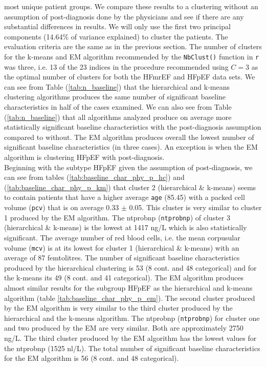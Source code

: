 \documentclass[../thesis.tex]{subfiles}
\begin{document}
\noindent most unique patient groups. We compare these results to a clustering without an assumption of post-diagnosis done by the physicians and see if there are any substantial differences in results. We will only use the first two principal components (14.64\% of variance explained) to cluster the patients. The evaluation criteria are the same as in the previous section. The number of clusters for the k-means and EM algorithm recommended by the \texttt{NbClust()} \citep{nbclust} function in \texttt{r} was three, i.e. 13 of the 23 indices in the procedure recommended using $C = 3$ as the optimal number of clusters for both the HFmrEF and HFpEF data sets. We can see from Table (\ref{tab:n_baseline}) that the hierarchical and k-means clustering algorithms produces the same number of significant baseline characteristics in half of the cases examined.  We can also see from Table (\ref{tab:n_baseline}) that all algorithms analyzed produce on average more statistically significant baseline characteristics with the post-diagnosis assumption compared to without. The EM algorithm produces overall the lowest number of significant baseline characteristics (in three cases). An exception is when the EM algorithm is clustering HFpEF with post-diagnosis.\\ 
\indent Beginning with the subtype HFpEF given the assumption of post-diagnosis, we can see from tables (\ref{tab:baseline_char_phy_p_hc}) and (\ref{tab:baseline_char_phy_p_km}) that cluster 2 (hierarchical \& k-means) seems to contain patients that have a higher average \texttt{age} (85.45) with a packed cell volume (\texttt{pcv}) that is on average 0.33 $\pm$ 0.05. This cluster is very similar to cluster 1 produced by the EM algorithm. The ntprobnp (\texttt{ntprobnp}) of cluster 3 (hierarchical \& k-means) is the lowest at 1417 ng/L which is also statistically significant. The average number of red blood cells, i.e. the mean corpusular volume (\texttt{mcv}) is at its lowest for cluster 1 (hierarchical \& k-means) with an average of 87 femtolitres. The number of significant baseline characteristics produced by the hierarchical clustering is 53 (8 cont. and 48 categorical) and for the k-means its 49 (8 cont. and 41 categorical). The EM algorithm produces almost similar results for the subgroup HFpEF as the hierarchical and k-means algorithm (table \ref{tab:baseline_char_phy_p_em}). The second cluster produced by the EM algorithm is very similar to the third cluster produced by the hierarchical and the k-means algorithm. The ntprobnp (\texttt{ntprobnp}) for cluster one and two produced by the EM are very similar. Both are approximately 2750 ng/L. The third cluster produced by the EM algorithm has the lowest values for the ntprobnp (1525 nl/L). The total number of significant baseline characteristics for the EM algorithm is 56 (8 cont. and 48 categorical). \\ 
\end{document}
